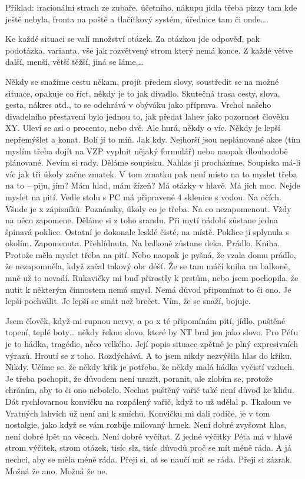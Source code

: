 \documentclass[DIV=calc, paper=a4, fontsize=11pt, twocolumn]{scrartcl}	 %
\begin{document}
Příklad: iracionální strach ze zubaře, účetního, nákupu jídla třeba
pizzy tam kde ještě nebyla, fronta na poště a tlačítkový systém,
úřednice tam či onde….

Ke každé situaci se valí množství otázek. Za otázkou jde odpověď, pak
podotázka, varianta, vše jak rozvětvený strom který nemá konce. Z
každé větve další, menší, větší těžší, jiná se láme,…

Někdy se snažíme cestu někam, projít předem slovy, soustředit se na
možné situace, opakuje co říct, někdy je to jak divadlo. Skutečná
trasa cesty, slova, gesta, nákres atd., to se odehrává v obýváku jako
příprava. Vrchol našeho divadelního přestavení bylo jednou to, jak
předat lahev jako pozornost člověku XY.  Uleví se asi o procento, nebo
dvě. Ale hurá, někdy o víc. Někdy je lepší nepřemýšlet a konat. Bolí
ji to míň. Jak kdy. Nejhorší jsou neplánované akce (tím myslím třeba
dojít na VZP vyplnit nějaký formulář) nebo naopak dlouhodobě
plánované. Nevím si rady. Děláme soupisku. Nahlas ji
procházíme. Soupiska má-li víc jak tři úkoly začne zmatek. V tom
zmatku pak není místo na to myslet třeba na to – piju, jím? Mám hlad,
mám žízeň? Má otázky v hlavě. Má jich moc. Nejde myslet na pití. Vedle
stolu s PC má připravené 4 sklenice s vodou. Na očích. Všude je x
zápisníků. Poznámky, úkoly co je třeba. Na co nezapomenout. Vždy na
něco zapomene. Děláme si z toho srandu. Při mytí nádobí zůstane jedna
špinavá poklice. Ostatní je dokonale lesklé čisté, na místě. Poklice
jí splynula s okolím. Zapomenuta. Přehlídnuta. Na balkoně zůstane
deka. Prádlo. Kniha. Protože měla myslet třeba na pití.  Nebo naopak
je pyšná, že vzala domu prádlo, že nezapomněla, když začal takový obr
déšť. Že se tam máčí kniha na balkoně, mně už to nevadí. Rukavičky mi
buď přirostly k prstům, nebo jsem pochopila, že nutit k některým
činnostem nemá smysl. Nemá důvod připomínat to či ono. Je lepší
pochválit. Je lepší se smát než brečet. Vím, že se snaží, bojuje.

Jsem člověk, když mi rupnou nervy, a po x té připomínám pití, jídlo,
puštěné topení, teplé boty… někdy řeknu slovo, které by NT bral jen
jako slovo. Pro Péťu je to hádka, tragédie, něco velkého. Její popis
situace zpětně je plný expresivních výrazů. Hroutí se z
toho. Rozdýchává. A to jsem nikdy nezvýšila hlas do
křiku. Nikdy. Učíme se, že někdy křik je potřeba, že někdy malá hádka
vyčistí vzduch. Je třeba pochopit, že důvodem není urazit, poranit,
ale zlobím se, protože chráním, aby to či ono nebolelo. Nechat puštěný
vařič také není důvod ke klidu. Dát rychlovarnou konvičku na rozpálený
vařič, když to už udělal p. Tkaloun ve Vratných lahvích už není ani k
smíchu. Konvičku mi dali rodiče, je v tom nostalgie, jako když se vám
rozbije milovaný hrnek. Není dobré zvyšovat hlas, není dobré lpět na
věcech. Není dobré vyčítat. Z jedné výčitky Péťa má v hlavě strom
výčitek, strom otázek, tisíc slz, tisíc důvodů proč se mít méně
ráda. A já nechci, aby se měla méně ráda. Přeji si, ať se naučí mít se
ráda. Přeji si zázrak. Možná že ano. Možná že ne.
\end{document}
